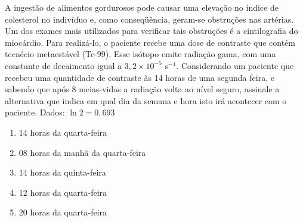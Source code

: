 A ingestão de alimentos gordurosos pode causar uma elevação no índice de colesterol no indivíduo e, como conseqüência, geram-se obstruções nas artérias. Um dos exames mais utilizados para verificar tais obstruções é a cintilografia do miocárdio. Para realizá-lo, o paciente recebe uma dose de contraste que contém tecnécio metaestável (Tc-99). Esse isótopo emite radiação gama, com uma constante de decaimento igual a $3,2 \times 10^{-5}$ s$^{-1}$. Considerando um paciente que recebeu uma quantidade de contraste às 14 horas de uma segunda feira, e sabendo que após 8 meias-vidas a radiação volta ao nível seguro, assinale a alternativa que indica em qual dia da semana e hora isto irá acontecer com o paciente. 
Dados: $\ln 2 = 0,693$

\begin{enumerate}[label = (\alph*)]
	
	\item 14 horas da quarta-feira 
	\item 08 horas da manhã da quarta-feira 
	\item 14 horas da quinta-feira 
	\item 12 horas da quarta-feira 
	\item 20 horas da quarta-feira
\end{enumerate}
